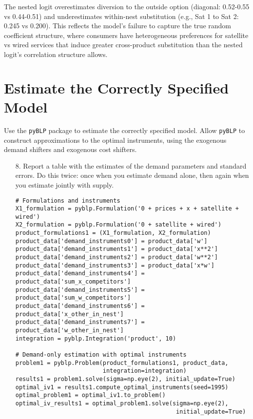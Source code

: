 \documentclass[english,11pt]{article}
\begin{document}
\begin{enumerate}
\noindent The nested logit overestimates diversion to the outside option (diagonal: 0.52-0.55 vs 0.44-0.51) and underestimates within-nest substitution (e.g., Sat 1 to Sat 2: 0.245 vs 0.200). This reflects the model's failure to capture the true random coefficient structure, where consumers have heterogeneous preferences for satellite vs wired services that induce greater cross-product substitution than the nested logit's correlation structure allows.

\section{Estimate the Correctly Specified Model}

Use the \texttt{pyBLP} package to estimate the correctly specified model. Allow
\texttt{pyBLP} to construct approximations to the optimal instruments, using the
exogenous demand shifters and exogenous cost shifters.

\begin{enumerate}
\item[8.] Report a table with the estimates of the demand
parameters and standard errors. Do this twice: once when you estimate demand
alone, then again when you estimate jointly with supply.

\begin{verbatim}
# Formulations and instruments
X1_formulation = pyblp.Formulation('0 + prices + x + satellite + wired')
X2_formulation = pyblp.Formulation('0 + satellite + wired')
product_formulations1 = (X1_formulation, X2_formulation)
product_data['demand_instruments0'] = product_data['w']
product_data['demand_instruments1'] = product_data['x**2']
product_data['demand_instruments2'] = product_data['w**2']
product_data['demand_instruments3'] = product_data['x*w']
product_data['demand_instruments4'] = product_data['sum_x_competitors']
product_data['demand_instruments5'] = product_data['sum_w_competitors']
product_data['demand_instruments6'] = product_data['x_other_in_nest']
product_data['demand_instruments7'] = product_data['w_other_in_nest']
integration = pyblp.Integration('product', 10)

# Demand-only estimation with optimal instruments
problem1 = pyblp.Problem(product_formulations1, product_data, 
                         integration=integration)
results1 = problem1.solve(sigma=np.eye(2), initial_update=True)
optimal_iv1 = results1.compute_optimal_instruments(seed=1995)
optimal_problem1 = optimal_iv1.to_problem()
optimal_iv_results1 = optimal_problem1.solve(sigma=np.eye(2), 
                                              initial_update=True)


\end{verbatim}
\end{enumerate}
\end{enumerate}
\end{document}
